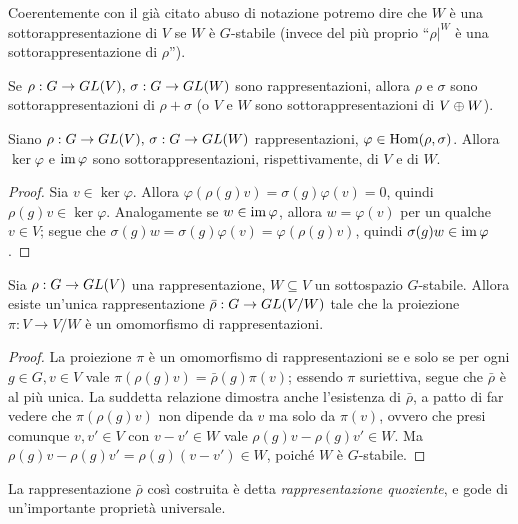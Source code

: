 Coerentemente con il già citato abuso di notazione potremo dire che $W$ è una sottorappresentazione di $V$ se $W$ è $G$-stabile (invece del più proprio ``$\rho|^W$ è una sottorappresentazione di $\rho$'').

\begin{example}
Se $\rho:G\to GL(V),\,\allowbreak\sigma:G\to GL(W)$ sono rappresentazioni, allora $\rho$ e $\sigma$ sono sottorappresentazioni di $\rho+\sigma$ (o $V$ e $W$ sono sottorappresentazioni di $V\oplus W$).
\end{example}

\begin{proposition}
Siano $\rho:G\to GL(V),\,\allowbreak\sigma:G\to GL(W)$ rappresentazioni, $\varphi\in\operatorname{Hom}(\rho,\sigma)$. Allora $\ker\varphi$ e $\operatorname{im}\varphi$ sono sottorappresentazioni, rispettivamente, di $V$ e di $W$.
\end{proposition}
\begin{proof}
Sia $v\in\ker\varphi$. Allora $\varphi(\rho(g)v)=\sigma(g)\varphi(v)=0$, quindi $\rho(g)v\in\ker\varphi$. Analogamente se $w\in\operatorname{im}\varphi$, allora $w=\varphi(v)$ per un qualche $v\in V$; segue che $\sigma(g)w=\sigma(g)\varphi(v)=\varphi(\rho(g)v)$, quindi $\sigma(g)w\in\operatorname{im}\varphi$.
\end{proof}

\begin{proposition}
Sia $\rho:G\to GL(V)$ una rappresentazione, $W\subseteq V$ un sottospazio $G$-stabile. Allora esiste un'unica rappresentazione $\bar\rho:G\to GL(V/W)$ tale che la proiezione $\pi:V\to V/W$ è un omomorfismo di rappresentazioni.
\end{proposition}
\begin{proof}
La proiezione $\pi$ è un omomorfismo di rappresentazioni se e solo se per ogni $g\in G\comma v\in V$ vale $\pi(\rho(g)v)=\bar\rho(g)\pi(v)$; essendo $\pi$ suriettiva, segue che $\bar\rho$ è al più unica. La suddetta relazione dimostra anche l'esistenza di $\bar\rho$, a patto di far vedere che $\pi(\rho(g)v)$ non dipende da $v$ ma solo da $\pi(v)$, ovvero che presi comunque $v,v'\in V$ con $v-v'\in W$ vale $\rho(g)v-\rho(g)v'\in W$. Ma $\rho(g)v-\rho(g)v'=\rho(g)(v-v')\in W$, poiché $W$ è $G$-stabile.
\end{proof}

La rappresentazione $\bar\rho$ così costruita è detta \emph{rappresentazione quoziente}, e gode di un'importante proprietà universale.

